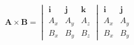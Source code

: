 \documentclass[10pt]{article}
\newcommand{\amp}{&}
\renewcommand{\vec}{\mathbf}%
\newcommand{\ihat}{\vec{i}}%
\newcommand{\jhat}{\vec{j}}%
\newcommand{\khat}{\vec{k}}
\begin{document}
\begin{align*}\vec{A} \times \vec{B} = \begin{vmatrix}
\ihat \amp \jhat \amp \khat \\ 
A_x \amp A_y \amp A_z \\ 
B_x \amp B_y  \amp B_z \end{vmatrix} 
\begin{matrix}
\ihat \amp \jhat\\
A_x \amp A_y\\
B_x \amp B_y
\end{matrix}\end{align*}
\end{document}

